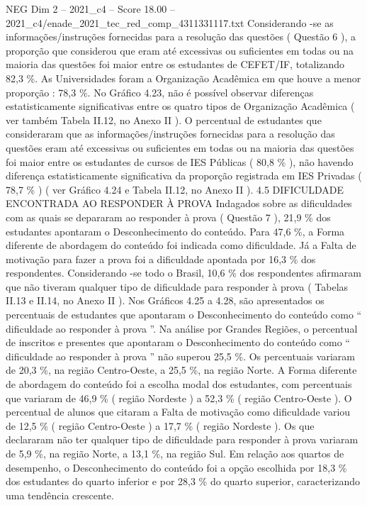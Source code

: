 \begin{textsample}{NEG Dim 2 – 2021\_c4 – Score 18.00 – 2021\_c4/enade\_2021\_tec\_red\_comp\_4311331117.txt}
Considerando -se as informações/instruções fornecidas para a resolução das questões ( Questão 6 ), a proporção que considerou que eram até excessivas ou suficientes em todas ou na maioria das questões foi maior entre os estudantes de CEFET/IF, totalizando 82,3 \%.
As Universidades foram a Organização Acadêmica em que houve a menor proporção : 78,3 \%.
No Gráfico 4.23, não é possível observar diferenças estatisticamente significativas entre os quatro tipos de Organização Acadêmica ( ver também Tabela II.12, no Anexo II ).
O percentual de estudantes que consideraram que as informações/instruções fornecidas para a resolução das questões eram até excessivas ou suficientes em todas ou na maioria das questões foi maior entre os estudantes de cursos de IES Públicas ( 80,8 \% ), não havendo diferença estatisticamente significativa da proporção registrada em IES Privadas ( 78,7 \% ) ( ver Gráfico 4.24 e Tabela II.12, no Anexo II ). 4.5 DIFICULDADE ENCONTRADA AO RESPONDER À PROVA Indagados sobre as dificuldades com as quais se depararam ao responder à prova ( Questão 7 ), 21,9 \% dos estudantes apontaram o Desconhecimento do conteúdo.
Para 47,6 \%, a Forma diferente de abordagem do conteúdo foi indicada como dificuldade.
Já a Falta de motivação para fazer a prova foi a dificuldade apontada por 16,3 \% dos respondentes.
Considerando -se todo o Brasil, 10,6 \% dos respondentes afirmaram que não tiveram qualquer tipo de dificuldade para responder à prova ( Tabelas II.13 e II.14, no Anexo II ).
Nos Gráficos 4.25 a 4.28, são apresentados os percentuais de estudantes que apontaram o Desconhecimento do conteúdo como “ dificuldade ao responder à prova ”.
Na análise por Grandes Regiões, o percentual de inscritos e presentes que apontaram o Desconhecimento do conteúdo como “ dificuldade ao responder à prova ” não superou 25,5 \%.
Os percentuais variaram de 20,3 \%, na região Centro-Oeste, a 25,5 \%, na região Norte.
A Forma diferente de abordagem do conteúdo foi a escolha modal dos estudantes, com percentuais que variaram de 46,9 \% ( região Nordeste ) a 52,3 \% ( região Centro-Oeste ).
O percentual de alunos que citaram a Falta de motivação como dificuldade variou de 12,5 \% ( região Centro-Oeste ) a 17,7 \% ( região Nordeste ).
Os que declararam não ter qualquer tipo de dificuldade para responder à prova variaram de 5,9 \%, na região Norte, a 13,1 \%, na região Sul.
Em relação aos quartos de desempenho, o Desconhecimento do conteúdo foi a opção escolhida por 18,3 \% dos estudantes do quarto inferior e por 28,3 \% do quarto superior, caracterizando uma tendência crescente.

\end{textsample}
